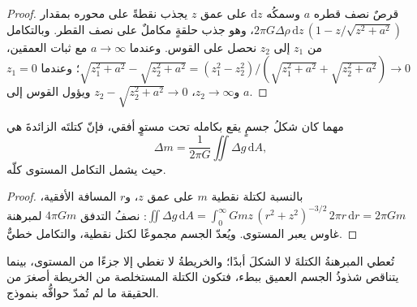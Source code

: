 \begin{proof}
قرصٌ نصف قطره $a$ وسمكُه $\mathrm{d}z$ على عمق $z$ يجذب
نقطةً على محوره بمقدار $2\pi G\Delta\rho\,\mathrm{d}z\,(1 -
z/\sqrt{z^2 + a^2})$، وهو جذب حلقةٍ مكاملٌ
على نصف القطر. وبالتكامل من $z_1$ إلى $z_2$ نحصل على القوس. وعندما $a \to
\infty$ مع ثبات العمقين، $\sqrt{z_1^2 + a^2} - \sqrt{z_2^2 + a^2} =
(z_1^2 - z_2^2)/(\sqrt{z_1^2 + a^2} + \sqrt{z_2^2 + a^2}) \to 0$؛ وعندما
$z_1 = 0$ و$z_2 \to \infty$، $z_2 - \sqrt{z_2^2 + a^2} \to 0$
ويؤول القوس إلى $a$.
\end{proof}

\begin{proposition}\label{prop:b3:field-lab-methods-3:gauss}
مهما كان شكلُ جسمٍ يقع بكامله تحت مستوٍ أفقي،
فإنّ كتلتَه الزائدةَ هي
\[
\Delta m = \frac{1}{2\pi G}\iint \Delta g\,\mathrm{d}A ,
\]
حيث يشمل التكامل المستوى كلّه.
\end{proposition}

\begin{proof}
بالنسبة لكتلة نقطية $m$ على عمق $z$، و$r$ المسافة الأفقية،
$\iint \Delta g\,\mathrm{d}A = \int_0^\infty
Gmz\,(r^2 + z^2)^{-3/2}\,2\pi r\,\mathrm{d}r = 2\pi Gm$: نصفُ التدفق
$4\pi Gm$ لمبرهنة غاوس يعبر المستوى. ويُعدّ الجسم مجموعًا لكتل نقطية،
والتكامل خطيٌّ.
\end{proof}

تُعطي المبرهنةُ الكتلةَ لا الشكلَ أبدًا؛ والخريطةُ لا تغطي إلا جزءًا من
المستوى، بينما يتناقص شذوذُ الجسم العميق ببطء، فتكون
الكتلة المستخلصة من الخريطة أصغرَ من الحقيقة ما لم تُمدّ حوافُّه
بنموذج.

